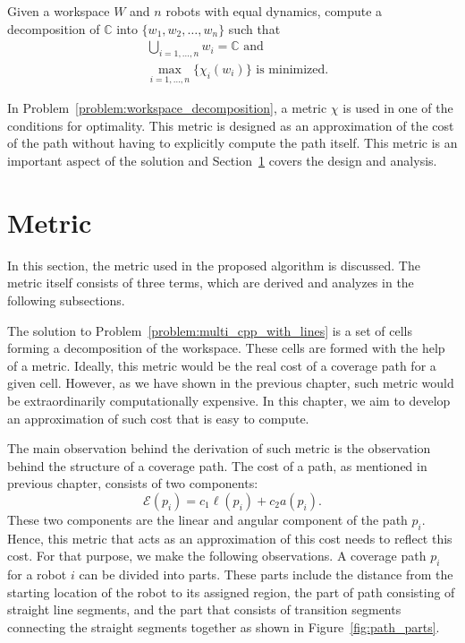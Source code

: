 \documentclass[../main.tex]{subfiles}
\begin{document}
\begin{problem}
\label{problem:workspace_decomposition}
	Given a workspace $W$ and $n$ robots with equal dynamics, compute a decomposition of $\mathbb{C}$ into $\{w_1,w_2,\dots,w_n\}$ such that
	\begin{equation}
	\begin{aligned}
		& \bigcup_{i=1,\dots,n}w_i=\mathbb{C}\text{ and}\\
		& \max_{i=1,\ldots,n}\{\chi_i(w_i)\}\text{ is minimized.}
	\end{aligned}
	\end{equation}
\end{problem}
In Problem~\ref{problem:workspace_decomposition}, a metric $\chi$ is used in one of the conditions for optimality. This metric is designed as an approximation of the cost of the path without having to explicitly compute the path itself. This metric is an important aspect of the solution and Section~\ref{section:metric} covers the design and analysis.

\section{Metric}
\label{section:metric}

In this section, the metric used in the proposed algorithm is discussed. The metric itself consists of three terms, which are derived and analyzes in the following subsections. 

The solution to Problem~\ref{problem:multi_cpp_with_lines} is a set of cells forming a decomposition of the workspace. These cells are formed with the help of a metric. Ideally, this metric would be the real cost of a coverage path for a given cell. However, as we have shown in the previous chapter, such metric would be extraordinarily  computationally expensive. In this chapter, we aim to develop an approximation of such cost that is easy to compute. 

The main observation behind the derivation of such metric is the observation behind the structure of a coverage path. The cost of a path, as mentioned in previous chapter, consists of two components:
\begin{equation}
	\mathcal{E}(p_i)=c_1\ell(p_i)+c_2a(p_i).
\end{equation}
These two components are the linear and angular component of the path $p_i$. Hence, this metric that acts as an approximation of this cost needs to reflect this cost. For that purpose, we make the following observations. A coverage path $p_i$ for a robot $i$ can be divided into parts. These parts include the distance from the starting location of the robot to its assigned region, the part of path consisting of straight line segments, and the part that consists of transition segments connecting the straight segments together as shown in Figure~\ref{fig:path_parts}. 
\end{document}
